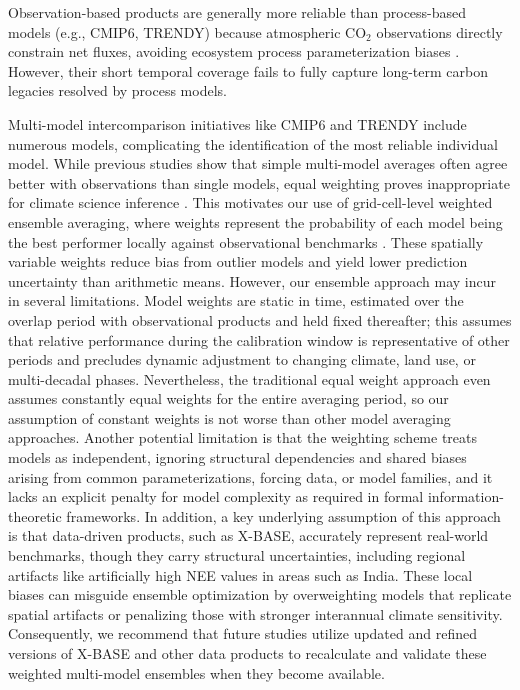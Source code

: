 \documentclass[ProofPDF]{./Styles/Jnls-Template-V3}
\begin{document}
Observation-based products are generally more reliable than process-based models (e.g., CMIP6, TRENDY) because atmospheric CO$_2$ observations directly constrain net fluxes, avoiding ecosystem process parameterization biases %
\citep{Gaubert2019,Woude2025}. However, their short temporal coverage fails to fully capture long-term carbon legacies resolved by process models.

Multi-model intercomparison initiatives like CMIP6 and TRENDY include numerous models, complicating the identification of the most reliable individual model. While previous studies show that simple multi-model averages often agree better with observations than single models, equal weighting proves inappropriate for climate science inference \citep{Hagedorn2005,Knutti2017}. This motivates our use of grid-cell-level weighted ensemble averaging, where weights represent the probability of each model being the best performer locally against observational benchmarks \citep{Sierra2025GDM}. These spatially variable weights reduce bias from outlier models and yield lower prediction uncertainty than arithmetic means. However, our ensemble approach may incur in several limitations. Model weights are static in time, estimated over the overlap period with observational products and held fixed thereafter; this assumes that relative performance during the calibration window is representative of other periods and precludes dynamic adjustment to changing climate, land use, or multi-decadal phases. Nevertheless, the traditional equal weight approach even assumes constantly equal weights for the entire averaging period, so our assumption of constant weights is not worse than other model averaging approaches. 
Another potential limitation is that the weighting scheme treats models as independent, ignoring structural dependencies and shared biases arising from common parameterizations, forcing data, or model families, and it lacks an explicit penalty for model complexity as required in formal information-theoretic frameworks. In addition, a key underlying assumption of this approach is that data-driven products, such as X-BASE, accurately represent real-world benchmarks, though they carry structural uncertainties, including regional artifacts like artificially high NEE values in areas such as India. These local biases can misguide ensemble optimization by overweighting models that replicate spatial artifacts or penalizing those with stronger interannual climate sensitivity. Consequently, we recommend that future studies utilize updated and refined versions of X-BASE and other data products to recalculate and validate these weighted multi-model ensembles when they become available.
\end{document}
